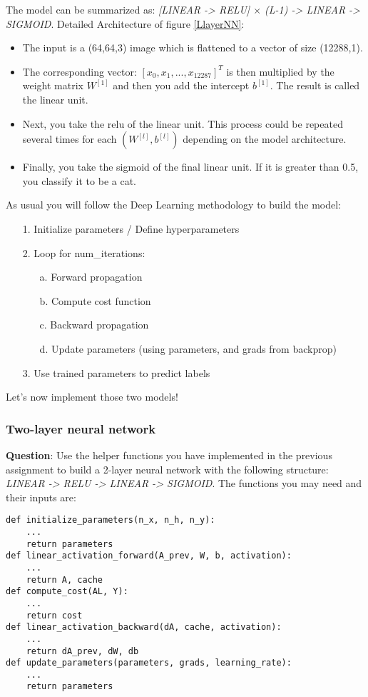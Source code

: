 The model can be summarized as: \emph{[LINEAR -> RELU]  $\times$  (L-1) -> LINEAR -> SIGMOID}. Detailed Architecture of figure \ref{LlayerNN}:
\begin{itemize}
\item The input is a (64,64,3) image which is flattened to a vector of size (12288,1).
\item The corresponding vector: $[x_0,x_1,...,x_{12287}]^T$ is then multiplied by the weight matrix $W^{[1]}$ and then you add the intercept $b^{[1]}$. The result is called the linear unit.
\item Next, you take the relu of the linear unit. This process could be repeated several times for each $(W^{[l]}, b^{[l]})$ depending on the model architecture.
\item Finally, you take the sigmoid of the final linear unit. If it is greater than 0.5, you classify it to be a cat.
\end{itemize}




As usual you will follow the Deep Learning methodology to build the model:
\begin{itemize}
\item[1.] Initialize parameters / Define hyperparameters
\item[2.] Loop for num\_iterations:
\begin{itemize}
\item[a.] Forward propagation
\item[b.] Compute cost function
\item[c.] Backward propagation
\item[d.] Update parameters (using parameters, and grads from backprop) 
\end{itemize}
\item[3.] Use trained parameters to predict labels
\end{itemize}

Let's now implement those two models!



\subsubsection{Two-layer neural network}

{\textbf {Question}}: Use the helper functions you have implemented in the previous assignment to build a 2-layer neural network with the following structure: \emph{LINEAR -> RELU -> LINEAR -> SIGMOID}. The functions you may need and their inputs are:
\begin{verbatim}
def initialize_parameters(n_x, n_h, n_y):
    ...
    return parameters 
def linear_activation_forward(A_prev, W, b, activation):
    ...
    return A, cache
def compute_cost(AL, Y):
    ...
    return cost
def linear_activation_backward(dA, cache, activation):
    ...
    return dA_prev, dW, db
def update_parameters(parameters, grads, learning_rate):
    ...
    return parameters
\end{verbatim}


